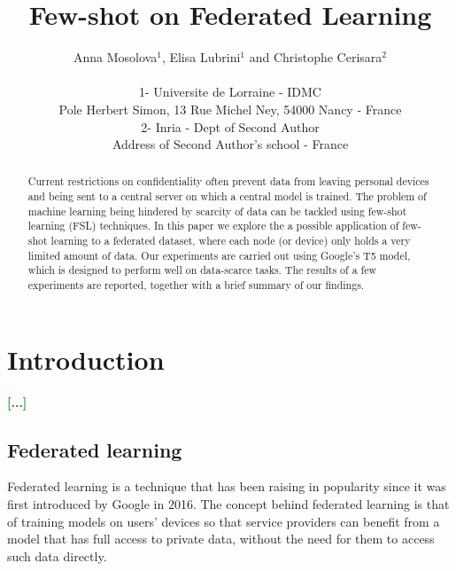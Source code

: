 \documentclass{esannV2}
\begin{document}
\title{Few-shot on Federated Learning}


\author{Anna Mosolova$^1$, Elisa Lubrini$^1$ and Christophe Cerisara$^2$ 

\vspace{.3cm}\\
%
1- Universite de Lorraine - IDMC \\
Pole Herbert Simon, 13 Rue Michel Ney, 54000 Nancy - France
%
\vspace{.1cm}\\
2- Inria - Dept of Second Author \\
Address of Second Author's school - France\\
}

\maketitle

\begin{abstract}
Current restrictions on confidentiality often prevent data from leaving personal devices and being sent to a central server on which a central model is trained. The problem of machine learning being hindered by scarcity of data can be tackled using few-shot learning (FSL) techniques. In this paper we explore the a possible application of few-shot learning to a federated dataset, where each node (or device) only holds a very limited amount of data. Our experiments are carried out using Google's T5 model, which is designed to perform well on data-scarce tasks. The results of a few experiments are reported, together with a brief summary of our findings.
\end{abstract}

\section{Introduction}
\textcolor{green}{\textbf{[...]}}

\subsection{Federated learning}
Federated learning is a technique that has been raising in popularity since it was first introduced by Google in 2016. The concept behind federated learning is that of training models on users' devices so that service providers can benefit from a model that has full access to private data, without the need for them to access such data directly.
\end{document}
